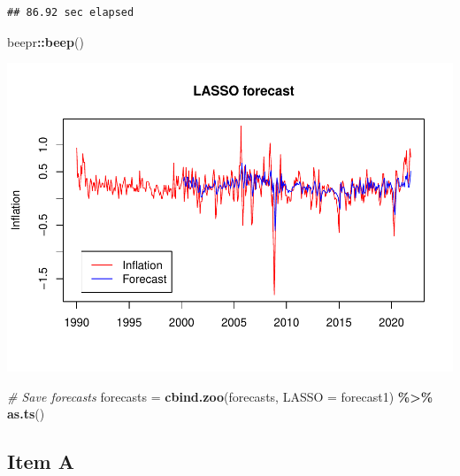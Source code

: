 \documentclass[
]{article}
\newenvironment{Shaded}{\begin{snugshade}}{\end{snugshade}}
\newcommand{\AttributeTok}[1]{\textcolor[rgb]{0.13,0.29,0.53}{#1}}
\newcommand{\CommentTok}[1]{\textcolor[rgb]{0.56,0.35,0.01}{\textit{#1}}}
\newcommand{\FunctionTok}[1]{\textcolor[rgb]{0.13,0.29,0.53}{\textbf{#1}}}
\newcommand{\NormalTok}[1]{#1}
\newcommand{\OtherTok}[1]{\textcolor[rgb]{0.56,0.35,0.01}{#1}}
\newcommand{\SpecialCharTok}[1]{\textcolor[rgb]{0.81,0.36,0.00}{\textbf{#1}}}
\begin{document}
\begin{verbatim}
## 86.92 sec elapsed
\end{verbatim}

\begin{Shaded}
\begin{Highlighting}[]
\NormalTok{beepr}\SpecialCharTok{::}\FunctionTok{beep}\NormalTok{()}
\end{Highlighting}
\end{Shaded}

\includegraphics{Trabalho_Econo4_Q2_files/figure-latex/unnamed-chunk-23-1.pdf}

\begin{Shaded}
\begin{Highlighting}[]
\CommentTok{\# Save forecasts}
\NormalTok{forecasts }\OtherTok{=} \FunctionTok{cbind.zoo}\NormalTok{(forecasts, }\AttributeTok{LASSO =}\NormalTok{ forecast1) }\SpecialCharTok{\%\textgreater{}\%} \FunctionTok{as.ts}\NormalTok{()}
\end{Highlighting}
\end{Shaded}

\hypertarget{item-a}{%
\subsection{Item A}\label{item-a}}
\end{document}
